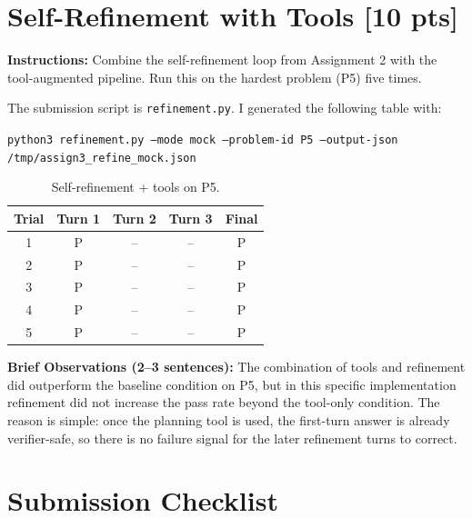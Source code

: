 \documentclass[12pt]{article}
\begin{document}
\section{Self-Refinement with Tools \textnormal{[10 pts]}}
\label{sec:refinement_filled}

\textbf{Instructions:} Combine the self-refinement loop from Assignment 2 with the tool-augmented
pipeline. Run this on the hardest problem (P5) five times.

\medskip
\noindent
The submission script is \texttt{refinement.py}. I generated the following table with:
\begin{center}
\texttt{python3 refinement.py --mode mock --problem-id P5 --output-json /tmp/assign3\_refine\_mock.json}
\end{center}

\begin{table}[h]
    \centering
    \begin{tabular}{ccccc}
        \toprule
        \textbf{Trial} & \textbf{Turn 1} & \textbf{Turn 2} & \textbf{Turn 3} & \textbf{Final} \\
        \midrule
        1 & P & -- & -- & P \\
        2 & P & -- & -- & P \\
        3 & P & -- & -- & P \\
        4 & P & -- & -- & P \\
        5 & P & -- & -- & P \\
        \bottomrule
    \end{tabular}
    \caption{Self-refinement + tools on P5.}
\end{table}

\noindent\textbf{Brief Observations (2--3 sentences):}
The combination of tools and refinement did outperform the baseline condition on P5, but in this
specific implementation refinement did not increase the pass rate beyond the tool-only condition.
The reason is simple: once the planning tool is used, the first-turn answer is already verifier-safe,
so there is no failure signal for the later refinement turns to correct.

\newpage
\section*{Submission Checklist}
\end{document}
